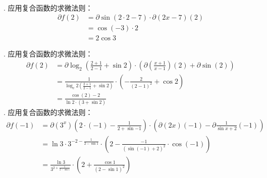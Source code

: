 \documentclass[12pt,UTF8,fontset=none]{ctexbook}
\begin{document}
\begin{so}
    \mbox{} \\
    . 应用复合函数的求微法则：
    \begin{align*}
        \partial f(2) &= \partial \sin (2 \cdot 2 - 7) \cdot \partial (2x - 7) (2)  \\
        &= \cos{(-3)} \cdot 2  \\
        &= 2 \cos{3}   
    \end{align*}
    
    . 应用复合函数的求微法则：
    \begin{align*}
        \partial f(2) &= \partial \log_2 \left(\frac{2+1}{2-1} + \sin{2}\right) \cdot \left(\partial \left(\frac{x+1}{x-1}\right) (2) + \partial \sin (2) \right) \\
        &= \frac{1}{\log_{\mathrm{e}}{2} \left(\frac{2+1}{2-1} + \sin{2}\right)} \cdot \left( -\frac{2}{(2 - 1)^2} + \cos{2} \right)  \\
        &= \frac{\cos{(2)} - 2}{\ln{2} \cdot (3 + \sin{2})}   
    \end{align*}
    . 应用复合函数的求微法则：
    \begin{align*}
        \partial f(-1) &= \partial (3^x) (2\cdot (-1) - \frac{1}{2 + \sin{-1}}) \cdot \left(\partial (2x) (-1) - \partial \frac{1}{\sin{x} + 2} (-1) \right)  \\
        &= \ln{3} \cdot 3^{-2 - \frac{1}{2 - \sin{1}}} \cdot \left(2 - \frac{-1}{(\sin{(-1)} + 2)^2} \cdot \cos{(-1)} \right)  \\
        &= \frac{\ln{3}}{3^{2 + \frac{1}{2 - \sin{1}}}} \cdot \left(2 + \frac{\cos{1}}{(2 - \sin{1})^2}\right)  
    \end{align*}

\end{so}
\end{document}
